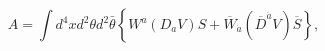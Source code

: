 \begin{equation}
A=\int d^{4}xd^{2}\theta d^{2}\bar{\theta}\left\{ W^{a}(D_{a}V)S+\overline{W}%
_{\dot{a}}(\overline{D}^{\dot{a}}V)\overline{S}\right\} ,  \label{superjac}
\end{equation}

